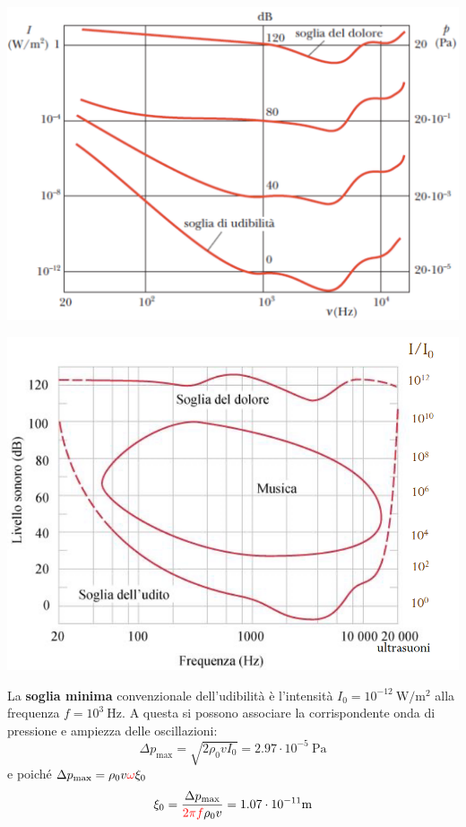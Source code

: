 \documentclass[x11names]{report}
\begin{document}
	\begin{minipage}{0.5\textwidth}
	\begin{center}
		\includegraphics[scale=0.25]{imgs/sogliadolore.png}
	\end{center}
	\end{minipage}
		\begin{minipage}{0.5\textwidth}
		\begin{center}
			\includegraphics[scale=0.35]{imgs/livello_sonoro.png}
		\end{center}
	\end{minipage}
	
	La\textbf{ soglia minima} convenzionale dell'udibilità è l'intensità \(I_0 = 10^{-12}\SI{}{\watt/\m^2}\) alla frequenza  \(f = 10^3\SI{}{\hertz}\). A questa si possono associare la corrispondente onda di pressione e ampiezza delle oscillazioni:
	\[ 
	\Delta p_{\text{max}} = \sqrt{2\rho_0 v I_0} = 2.97 \cdot 10^{-5} \SI{}{\pascal}
	\]
	e poiché  \(\Delta p_{\text{max}} = \rho_0 v \textcolor{red}{\omega } \xi_0\)
	\[ 
	\xi_0 = \frac{\Delta p_{\text{max}}}{\textcolor{red}{2\pi f}\rho_0 v} = 1.07 \cdot 10^{-11}\SI{}{\m}
	\]
	
\end{document}
